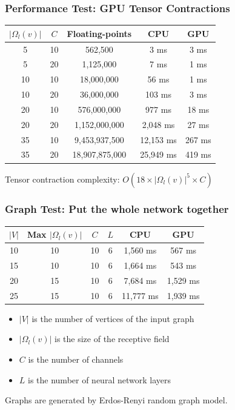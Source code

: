 \documentclass{beamer}
\begin{document}
\begin{frame}
\frametitle{Performance Test: GPU Tensor Contractions}
\begin{center}
\begin{tabular}{|| c | c | c | c | c ||}
	\hline
	$|\Omega_l(v)|$ & $C$ & Floating-points & CPU & GPU \\
	\hline\hline
	5 & 10 & 562,500 & 3 ms & 3 ms \\
	\hline
	5 & 20 & 1,125,000 & 7 ms & 1 ms \\
	\hline
	10 & 10 & 18,000,000 & 56 ms & 1 ms \\
	\hline
	10 & 20 & 36,000,000 & 103 ms & 3 ms \\
	\hline
	20 & 10 & 576,000,000 & 977 ms & 18 ms \\
	\hline 
	20 & 20 & 1,152,000,000 & 2,048 ms & 27 ms \\
	\hline
	35 & 10 & 9,453,937,500 & 12,153 ms & 267 ms \\
	\hline
	35 & 20 & 18,907,875,000 & 25,949 ms & 419 ms \\
	\hline
\end{tabular}
\end{center}
Tensor contraction complexity: $O(18 \times |\Omega_l(v)|^5 \times C)$
\end{frame}

\begin{frame}
\frametitle{Graph Test: Put the whole network together}
\begin{center}
\begin{tabular}{|| c | c | c | c | c | c ||}
	\hline
	$|V|$ & Max $|\Omega_l(v)|$ & $C$ & $L$ & CPU & GPU \\
	\hline\hline
	10 & 10 & 10 & 6 & 1,560 ms & 567 ms \\
	\hline
	15 & 10 & 10 & 6 & 1,664 ms & 543 ms \\
	\hline 
	20 & 15 & 10 & 6 & 7,684 ms & 1,529 ms \\
	\hline
	25 & 15 & 10 & 6 & 11,777 ms & 1,939 ms \\
	\hline
\end{tabular}
\end{center}
\begin{itemize}
	\item $|V|$ is the number of vertices of the input graph
	\item $|\Omega_l(v)|$ is the size of the receptive field
	\item $C$ is the number of channels
	\item $L$ is the number of neural network layers
\end{itemize}
Graphs are generated by Erdos-Renyi random graph model.
\end{frame}
\end{document}
